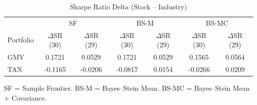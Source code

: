 \documentclass[11pt]{exam}
\begin{document}
\begin{table}[h!]
\centering
\caption{Sharpe Ratio Delta (Stock -- Industry)}
\label{tab:stock-v-ind}
\setlength{\tabcolsep}{4pt}
\small
\begin{tabular}{lcccccc}
\toprule
 & \multicolumn{2}{c}{SF} 
 & \multicolumn{2}{c}{BS-M} 
 & \multicolumn{2}{c}{BS-MC} \\
Portfolio 
 & $\Delta$SR (30) & $\Delta$SR (29)
 & $\Delta$SR (30) & $\Delta$SR (29)
 & $\Delta$SR (30) & $\Delta$SR (29) \\
\midrule
GMV & 0.1721 & 0.0529 & 0.1721 & 0.0529 & 0.1565 & 0.0564 \\
TAN & -0.1165 & -0.0206 & -0.0817 & 0.0154 & -0.0266 & 0.0209 \\
\bottomrule
\end{tabular}

\vspace{3pt}
\footnotesize
SF = Sample Frontier. 
BS-M = Bayes--Stein Mean. 
BS-MC = Bayes--Stein Mean + Covariance.
\end{table}
\FloatBarrier




\clearpage
\newpage
\end{document}
